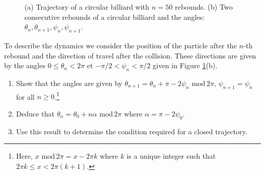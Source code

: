 \documentclass{article}
\begin{document}
\begin{question}
\begin{figure}[h]
    \caption{(a) Trajectory of a circular billiard with $n=50$ rebounds. (b) Two consecutive rebounds  of a circular billiard and the angles: $\theta_n,\theta_{n+1},\psi_n,\psi_{n+1}$.}
    \label{fig:Billard}
  \end{figure}
  
  To describe the dynamics we consider the position of the particle after the $n$-th rebound and the direction of travel after the collision. These directions are given by the angles $0\leqslant \theta_n < 2\pi $ et $-\pi/2< \psi_n<\pi/2$ given in Figure \ref{fig:Billard}(b). 
  \begin{enumerate}[label=(\alph*)]
  \item Show that the angles are given by
   $ \theta_{n+1}  = \theta_n +\pi-2\psi_n\,\, \text{mod}\, 2\pi,\,\psi_{n+1} = \psi_n$ 
  for all $n\geqslant 0$.\footnote{Here, $x\,\,\text{mod}\, 2\pi = x-2\pi k$ where $k$ is a unique integer such that $2\pi k \leqslant x < 2\pi(k+1)$.}
   \item Deduce that $\theta_n=\theta_0 + n \alpha \,\,\text{mod}\, 2\pi$ where $\alpha = \pi -2\psi_0$.
   \item Use this result to determine the condition required for a closed trajectory.
  \end{enumerate}
\end{question}



 
\end{document}
